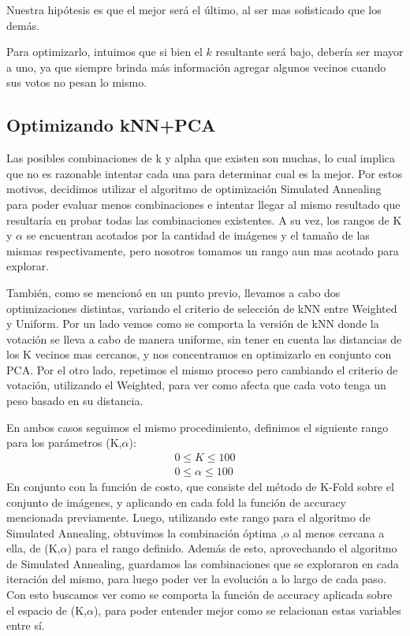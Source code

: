 \documentclass[a4paper]{article}
\begin{document}
    Nuestra hipótesis es que el mejor será el último, al ser mas sofisticado que los demás.
    
    Para optimizarlo, intuimos que si bien el $k$ resultante será bajo, debería ser mayor a uno, ya que siempre brinda más información agregar algunos vecinos cuando sus votos no pesan lo mismo.
    
    \subsection{Optimizando kNN+PCA}\label{exp-knn+pca-opt}
    Las posibles combinaciones de k y alpha que existen son muchas, lo cual implica que no es razonable intentar cada una para determinar cual es la mejor. Por estos motivos, decidimos utilizar el algoritmo de optimización Simulated Annealing para poder evaluar menos combinaciones e intentar llegar al mismo resultado que resultaría en probar todas las combinaciones existentes. A su vez, los rangos de K y $\alpha$ se encuentran acotados por la cantidad de imágenes y el tamaño de las mismas respectivamente, pero nosotros tomamos un rango aun mas acotado para explorar.
    
    También, como se mencionó en un punto previo, llevamos a cabo dos optimizaciones distintas, variando el criterio de selección de kNN entre Weighted y Uniform. Por un lado vemos como se comporta la versión de kNN donde la votación se lleva a cabo de manera uniforme, sin tener en cuenta las distancias de los K vecinos mas cercanos, y nos concentramos en optimizarlo en conjunto con PCA. Por el otro lado, repetimos el mismo proceso pero cambiando el criterio de votación, utilizando el Weighted, para ver como afecta que cada voto tenga un peso basado en su distancia.
    
    En ambos casos seguimos el mismo procedimiento, definimos el siguiente rango para los parámetros (K,$\alpha$):
    \begin{align*}
    0 \leq    K   \leq  100\\
    0 \leq   \alpha   \leq  100
    \end{align*}
    En conjunto con la función de costo, que consiste del método de K-Fold sobre el conjunto de imágenes, y aplicando en cada fold la función de accuracy mencionada previamente. Luego, utilizando este rango para el algoritmo de Simulated Annealing, obtuvimos la combinación óptima ,o al menos cercana a ella, de (K,$\alpha$) para el rango definido. Además de esto, aprovechando el algoritmo de Simulated Annealing, guardamos las combinaciones que se exploraron en cada iteración del mismo, para luego poder ver la evolución a lo largo de cada paso. Con esto buscamos ver como se comporta la función de accuracy aplicada sobre el espacio de (K,$\alpha$), para poder entender mejor como se relacionan estas variables entre sí.
    
\end{document}
